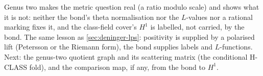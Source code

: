 \begin{observation}
\label{obs:genus-two-next}
Genus two makes the metric question real (a ratio modulo scale) and shows what it is not: neither the bond's theta
normalisation nor the $L$-values nor a rational marking fixes it, and the class-field cover's $H^1$ is labelled, not
carried, by the bond. The same lesson as \cref{sec:deninger-lps}: positivity is supplied by a polarised lift (Petersson
or the Riemann form), the bond supplies labels and $L$-functions. Next: the genus-two quotient graph and its scattering
matrix (the conditional H-CLASS fold), and the comparison map, if any, from the bond to $H^1$.
\end{observation}
